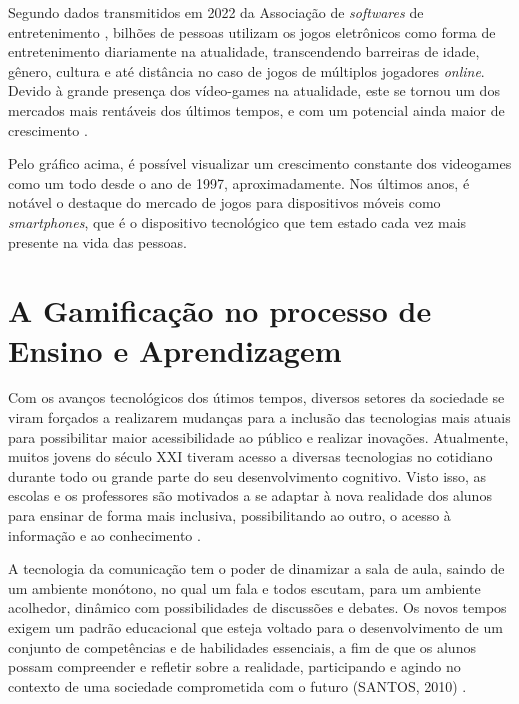 Segundo dados transmitidos em 2022 da Associação de \textit{softwares} de entretenimento \cite{esa_report_2022}, bilhões de pessoas utilizam os jogos eletrônicos como forma de entretenimento diariamente na atualidade, transcendendo barreiras de idade, gênero, cultura e até distância no caso de jogos de múltiplos jogadores \textit{online}. Devido à grande presença dos vídeo-games na atualidade, este se tornou um dos mercados mais rentáveis dos últimos tempos, e com um potencial ainda maior de crescimento \cite{video-game-economics}.


Pelo gráfico acima, é possível visualizar um crescimento constante dos videogames como um todo desde o ano de 1997, aproximadamente. Nos últimos anos, é notável o destaque do mercado de jogos para dispositivos móveis como \textit{smartphones}, que é o dispositivo tecnológico que tem estado cada vez mais presente na vida das pessoas.

\section{A Gamificação no processo de Ensino e Aprendizagem}

Com os avanços tecnológicos dos útimos tempos, diversos setores da sociedade se viram forçados a realizarem mudanças para a inclusão das tecnologias mais atuais para possibilitar maior acessibilidade ao público e realizar inovações. Atualmente, muitos jovens do século XXI tiveram acesso a diversas tecnologias no cotidiano durante todo ou grande parte do seu desenvolvimento cognitivo. Visto isso, as escolas e os professores são motivados a se adaptar à nova realidade dos alunos para  ensinar de forma mais inclusiva, possibilitando ao outro, o acesso à informação e ao conhecimento \cite{tecnologia-professores}.

A tecnologia da comunicação tem o poder de dinamizar a sala de aula, saindo de um ambiente monótono, no qual um fala e todos escutam, para um ambiente acolhedor, dinâmico com possibilidades de discussões e debates. Os novos tempos exigem um padrão educacional que esteja voltado para o desenvolvimento de um conjunto de competências e de habilidades essenciais, a fim de que os alunos possam compreender e refletir sobre a realidade, participando e agindo no contexto de uma sociedade comprometida com o futuro (SANTOS, 2010) \cite{tecnologia-professores}.

